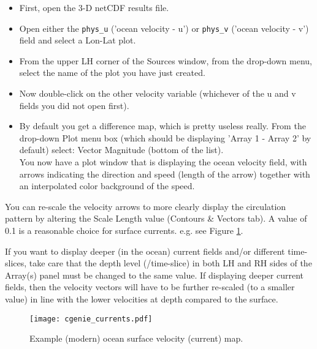 \documentclass[11pt,fleqn]{book} %
\begin{document}
\begin{itemize}
\vspace{1mm}
\item First, open the 3-D netCDF results file.
\vspace{1mm}
\item Open either the \texttt{phys\_u} ('ocean velocity - u') or \texttt{phys\_v} ('ocean velocity - v') field and select a \footnotesize\textsf{Lon-Lat }\normalsize plot.
\vspace{1mm}
\item From the upper LH corner of the \footnotesize\textsf{Sources }\normalsize window, from the drop-down menu, select the name of the plot you have just created.
\vspace{1mm}
\item Now double-click on the other velocity variable (whichever of the u and v fields you did not open first).
\vspace{1mm}
\item By default you get a difference map, which is pretty useless really. From the drop-down \footnotesize\textsf{Plot }\normalsize menu box (which should be displaying 'Array 1 - Array 2' by default) select: \footnotesize\textsf{Vector Magnitude }\normalsize(bottom of the list).
\\ You now have a plot window that is displaying the ocean velocity field, with arrows indicating the direction and speed (length of the arrow) together with an interpolated color background of the speed.
\end{itemize}
\vspace{2mm}

You can re-scale the velocity arrows to more clearly display the circulation pattern by altering the \footnotesize\textsf{Scale Length }\normalsize value (\footnotesize\textsf{Contours \& Vectors }\normalsize tab). A value of 0.1 is a reasonable choice for surface currents. e.g. see Figure \ref{fig:cgenie_currents}.

If you want to display deeper (in the ocean) current fields and/or different time-slices, take care that the depth level (/time-slice) in both LH and RH sides of the \footnotesize\textsf{Array(s) }\normalsize panel must be changed to the same value. If displaying deeper current fields, then the velocity vectors will have to be further re-scaled (to a smaller value) in line with the lower velocities at depth compared to the surface.

\newpage

\begin{figure}[ht]
\begin{center}
\texttt{[image: cgenie\_currents.pdf]}
\end{center}
\caption{Example (modern) ocean surface velocity (current) map.}
\label{fig:cgenie_currents}
\end{figure}
\end{document}
